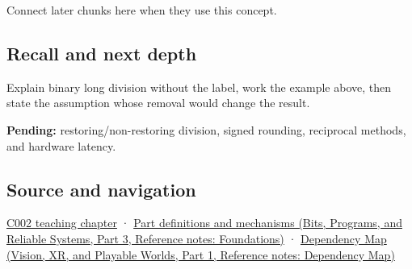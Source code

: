 \hypertarget{appendix-89985e6a2685-used-by}{}

Connect later chunks here when they use this concept.

\subsection{Recall and next depth}\label{appendix-89985e6a2685-recall-and-next-depth}

\hypertarget{appendix-89985e6a2685-recall-and-next-depth}{}

Explain binary long division without the label, work the example above, then state the assumption whose removal would change the result.

\textbf{Pending:} restoring/non-restoring division, signed rounding, reciprocal methods, and hardware latency.

\subsection{Source and navigation}\label{appendix-89985e6a2685-source-and-navigation}

\hypertarget{appendix-89985e6a2685-source-and-navigation}{}

\hyperref[01-foundations-i-ch001-arithmetic-becomes-a-policy]{C002 teaching chapter} · \href{../01-Bits-Programs-and-Reliable-Systems-P03/main.pdf\#appendix-fd090d982a15}{Part definitions and mechanisms (Bits, Programs, and Reliable Systems, Part 3, Reference notes: Foundations)} · \href{../07-Vision-XR-and-Playable-Worlds-P01/main.pdf\#appendix-4ad47bdd269a}{Dependency Map (Vision, XR, and Playable Worlds, Part 1, Reference notes: Dependency Map)}
